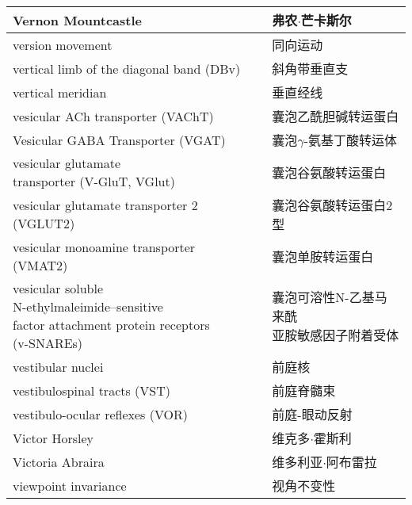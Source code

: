 \begin{longtable}{lll}
	\midrule
	Vernon Mountcastle   && 弗农$\cdot$芒卡斯尔  \\
	
	\midrule
	version movement   && 同向运动  \\
	
	\midrule
	vertical limb of the diagonal band (DBv)    &&  斜角带垂直支  \\
	
	\midrule
	vertical meridian    &&  垂直经线  \\
	
	\midrule
	vesicular ACh transporter (VAChT)   && 囊泡乙酰胆碱转运蛋白  \\
	
	\midrule
	Vesicular GABA Transporter (VGAT)   && 囊泡$\gamma$-氨基丁酸转运体  \\
	
	\midrule
	\makecell[l]{vesicular glutamate \\transporter (V-GluT, VGlut)}   && 囊泡谷氨酸转运蛋白  \\
	
	\midrule
	vesicular glutamate transporter 2 (VGLUT2)   && 囊泡谷氨酸转运蛋白2型  \\
	
	\midrule
	vesicular monoamine transporter (VMAT2)   && 囊泡单胺转运蛋白  \\
	
	\midrule
	\makecell[l]{vesicular soluble \\N-ethylmaleimide–sensitive \\factor attachment protein receptors\\ (v-SNAREs)}  && \makecell[l]{囊泡可溶性N-乙基马来酰\\亚胺敏感因子附着受体}  \\
	
	\midrule
	vestibular nuclei   && 前庭核  \\
	
	\midrule
	vestibulospinal tracts (VST)   && 前庭脊髓束  \\
	
	\midrule
	vestibulo-ocular reflexes (VOR)   && 前庭-眼动反射  \\
	
	\midrule
	Victor Horsley   && 维克多$\cdot$霍斯利  \\
	
	\midrule
	Victoria Abraira   && 维多利亚$\cdot$阿布雷拉  \\
	
	\midrule
	viewpoint invariance   && 视角不变性  \\
	

\end{longtable}

